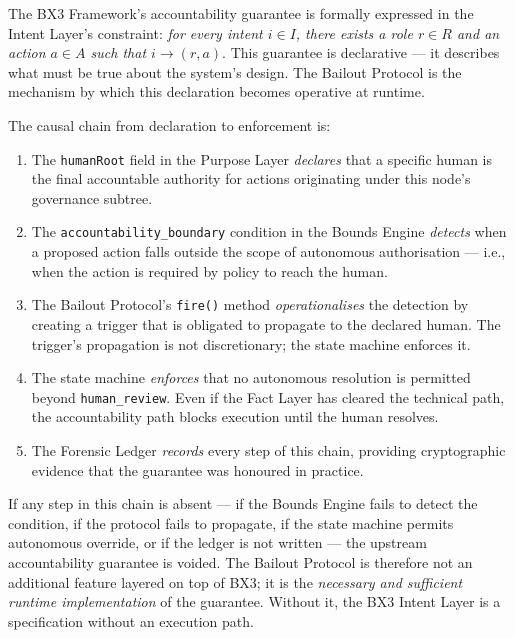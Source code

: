 The BX3 Framework's accountability guarantee is formally expressed in the Intent
Layer's constraint: \emph{for every intent $i \in I$, there exists a role $r \in R$
and an action $a \in A$ such that $i \rightarrow (r, a)$}.  This guarantee is
declarative — it describes what must be true about the system's design.  The Bailout
Protocol is the mechanism by which this declaration becomes operative at runtime.

The causal chain from declaration to enforcement is:

\begin{enumerate}
  \item The \texttt{humanRoot} field in the Purpose Layer \emph{declares} that a
        specific human is the final accountable authority for actions originating
        under this node's governance subtree.

  \item The \texttt{accountability\_boundary} condition in the Bounds Engine
        \emph{detects} when a proposed action falls outside the scope of autonomous
        authorisation — i.e., when the action is required by policy to reach the human.

  \item The Bailout Protocol's \texttt{fire()} method \emph{operationalises} the
        detection by creating a trigger that is obligated to propagate to the
        declared human.  The trigger's propagation is not discretionary; the state
        machine enforces it.

  \item The state machine \emph{enforces} that no autonomous resolution is
        permitted beyond \texttt{human\_review}.  Even if the Fact Layer has cleared
        the technical path, the accountability path blocks execution until the
        human resolves.

  \item The Forensic Ledger \emph{records} every step of this chain, providing
        cryptographic evidence that the guarantee was honoured in practice.
\end{enumerate}

If any step in this chain is absent — if the Bounds Engine fails to detect the
condition, if the protocol fails to propagate, if the state machine permits
autonomous override, or if the ledger is not written — the upstream accountability
guarantee is voided.  The Bailout Protocol is therefore not an additional feature
layered on top of BX3; it is the \emph{necessary and sufficient runtime implementation}
of the guarantee.  Without it, the BX3 Intent Layer is a specification without
an execution path.

